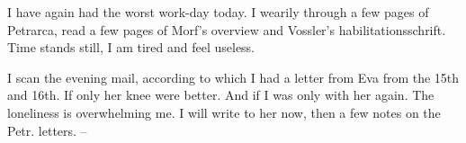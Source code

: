 

\missing

I have again had the worst work-day today. I wearily  through a few pages of Petrarca, read a few pages of Morf's overview and Vossler's habilitationsschrift. Time stands still, I am tired and feel useless.

\missing I scan the evening mail, according to which I had a letter from Eva from the 15th and 16th. If only her knee were better. And if I was only with her again. The loneliness is overwhelming me. I will write to her now, then a few notes on the Petr. letters. --

\missing


%
